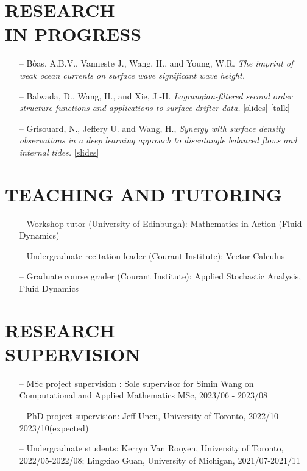 \documentclass[margin]{res}
\begin{document}
\begin{resume}
\section{{\normalfont RESEARCH\\IN PROGRESS}}
\begin{itemize}

\item[--] B\^{o}as, A.B.V., Vanneste J.,  Wang, H., and Young, W.R. \textit{The imprint of weak ocean currents on surface wave significant wave height.} 
\item[--] Balwada, D., Wang, H., and Xie, J.-H. \textit{Lagrangian-filtered second order structure functions and applications to surface drifter data.} \href{https://hannnwang.github.io/slide_trr_2023.pdf}{[slides]}  \href{https://www.youtube.com/watch?v=3HQ-iV7y3gI}{[talk]}    
\item[--]  Grisouard, N., Jeffery U. and Wang, H., \textit{Synergy with surface density observations in a deep learning approach to disentangle balanced flows and internal tides.} \href{https://hannnwang.github.io/slide_Jeff_EWM2023-1.pdf}{[slides]}
\end{itemize}

\section{{\normalfont TEACHING AND TUTORING}}
\begin{itemize}[leftmargin=*,noitemsep]
\item[--]{Workshop tutor (University of Edinburgh): Mathematics in Action (Fluid Dynamics)  }
\item[--]{Undergraduate recitation leader  (Courant Institute): Vector Calculus}
\item[--]{Graduate course grader  (Courant Institute): Applied Stochastic Analysis, Fluid Dynamics}
\end{itemize}
\section{{\normalfont RESEARCH\\SUPERVISION}}
\begin{itemize}[leftmargin=*,noitemsep]
\item[--]{MSc project supervision : Sole supervisor for Simin Wang on Computational and Applied Mathematics MSc, 2023/06 - 2023/08} 
\item[--]{PhD project supervision: Jeff Uncu, University of Toronto, 2022/10-2023/10(expected)}
\item[--]{Undergraduate students: Kerryn Van Rooyen, University of Toronto, 2022/05-2022/08; Lingxiao Guan, University of Michigan, 2021/07-2021/11}
\end{itemize}


\end{resume}
\end{document}
